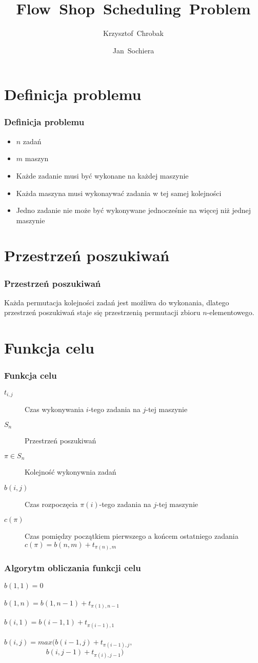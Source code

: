 \documentclass[10pt]{beamer}
\title[Flow Shop Scheduling Problem]{Flow~Shop~Scheduling~Problem}
\author[Krzysztof Chrobak\and Jan Sochiera]{Krzysztof~Chrobak \and Jan~Sochiera}
\institute[Algorytmy Ewolucyjne 2012]{\normalsize Algorytmy Ewolucyjne 2012}
\begin{document}
  \frame
  {
    \titlepage
  }



  \section{Definicja problemu}


  \frame
  {
    \frametitle{Definicja problemu}

    \begin{itemize}
    	\item<1-> $n$ zadań
    	\item<2-> $m$ maszyn
	\item<3-> Każde zadanie musi być wykonane na każdej maszynie
	\item<4-> Każda maszyna musi wykonaywać zadania w tej samej kolejności
	\item<5-> Jedno zadanie nie może być wykonywane jednocześnie na więcej niż jednej maszynie
    \end{itemize}
  }

  \section{Przestrzeń poszukiwań}

\frame
	{
	\frametitle{Przestrzeń poszukiwań}
	\begin{center}
	Każda permutacja kolejności zadań jest możliwa do wykonania, dlatego przestrzeń poszukiwań staje się przestrzenią permutacji zbioru $n$-elementowego.  
	\end{center}
	}

\section{Funkcja celu}
\frame
	{
	\frametitle{Funkcja celu}
	\begin{description}
		
		\item[$t_{i,j}$] Czas wykonywania $i$-tego zadania na $j$-tej maszynie
		\item[$S_n$] Przestrzeń poszukiwań
  		\item[$\pi \in S_n$] Kolejność wykonywnia zadań
  		\item[$b(i,j)$] Czas rozpoczęcia $\pi(i)$-tego zadania na $j$-tej maszynie
  		\item[$c(\pi)$] Czas pomiędzy początkiem pierwszego a końcem ostatniego zadania \hfill \\
				$c(\pi) = b(n,m) + t_{\pi (n), m}$
		
	\end{description}
	}

\frame
	{
	\frametitle{Algorytm obliczania funkcji celu}
	
	$b(1,1) = 0$\\~\\
	$b(1,n) = b(1,n-1) + t_{\pi(1),n-1}$\\~\\
	$b(i,1) = b(i-1,1) + t_{\pi(i-1),1}$\\~\\
	$b(i,j) = max(b(i-1, j) + t_{\pi(i-1),j},$\\$\;\;\;\;\;\;\;\;\;\;\;\;\;\;\;\;\;\;\;\;\;b(i, j-1) + t_{\pi(i),j-1})$
	
	}
\end{document}
